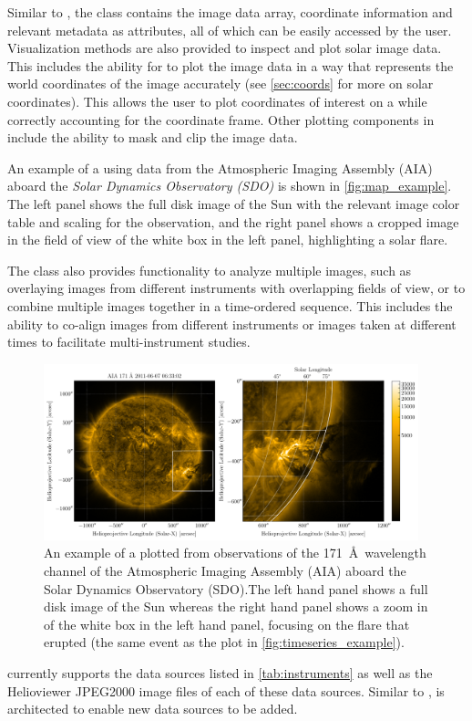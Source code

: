 Similar to \TimeSeries, the \Map class contains the image data array, coordinate information and relevant metadata as attributes, all of which can be easily accessed by the user.
Visualization methods are also provided to inspect and plot solar image data.
This includes the ability for \Map to plot the image data in a way that represents the world coordinates of the image accurately (see \autoref{sec:coords} for more on solar coordinates).
This allows the user to plot coordinates of interest on a \Map while correctly accounting for the coordinate frame.
Other plotting components in \Map include the ability to mask and clip the image data.

An example of a \Map using data from the Atmospheric Imaging Assembly (AIA) aboard the \textit{Solar Dynamics Observatory (SDO)} is shown in \autoref{fig:map_example}.
The left panel shows the full disk image of the Sun with the relevant image color table and scaling for the observation, and the right panel shows a cropped image in the field of view of the white box in the left panel, highlighting a solar flare.

The \Map class also provides functionality to analyze multiple images, such as overlaying images from different instruments with overlapping fields of view, or to combine multiple images together in a time-ordered sequence.
This includes the ability to co-align images from different instruments or images taken at different times to facilitate multi-instrument studies.


\begin{figure}
    \centering
    \includegraphics[width=0.97\textwidth]{figures/map_example.pdf}
    \caption{An example of a \sunpypkg \Map plotted from observations of the 171~\AA\ wavelength channel of the Atmospheric Imaging Assembly (AIA) aboard the Solar Dynamics Observatory (SDO).The left hand panel shows a full disk image of the Sun whereas the right hand panel shows a zoom in of the white box in the left hand panel, focusing on the flare that erupted (the same event as the \Timeseries plot in \autoref{fig:timeseries_example}).}
    \label{fig:map_example}
\end{figure}

\Map currently supports the data sources listed in \autoref{tab:instruments} as well as the Helioviewer JPEG2000 image files of  each of these data sources. Similar to \Timeseries, \Map is architected to enable new data sources to be added. 
